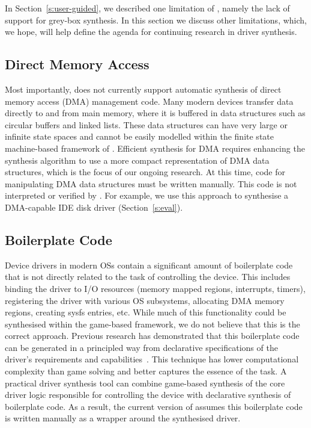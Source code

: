 In Section~\ref{s:user-guided}, we described one limitation of \termite, namely the lack of support for grey-box synthesis.  In this section we discuss other limitations, which, we hope, will help define the agenda for continuing research in driver synthesis.

\subsection{Direct Memory Access}

Most importantly, \termite does not currently support automatic synthesis of direct memory access (DMA) management code.  Many modern devices transfer data directly to and from main memory, where it is buffered in data structures such as circular buffers and linked lists.  These data structures can have very large or infinite state spaces and cannot be easily modelled within the finite state machine-based framework of \termite.  Efficient synthesis for DMA requires enhancing the synthesis algorithm to use a more compact representation of DMA data structures, which is the focus of our ongoing research.  At this time, code for manipulating DMA data structures must be written manually.  This code is not interpreted or verified by \termite.  For example, we use this approach to synthesise a DMA-capable IDE disk driver (Section~\ref{s:eval}).

\subsection{Boilerplate Code}

Device drivers in modern OSs contain a significant amount of boilerplate code that is not directly related to the task of controlling the device.  This includes binding the driver to I/O resources (memory mapped regions, interrupts, timers), registering the driver with various OS subsystems, allocating DMA memory regions, creating sysfs entries, etc.  While much of this functionality could be synthesised within the game-based framework, we do not believe that this is the correct approach.  Previous research has demonstrated that this boilerplate code can be generated in a principled way from declarative specifications of the driver's requirements and capabilities~\cite{Spear_RHHL_06}.  This technique has lower computational complexity than game solving and better captures the essence of the task.  A practical driver synthesis tool can combine game-based synthesis of the core driver logic responsible for controlling the device with declarative synthesis of boilerplate code.  As a result, the current version of \termite assumes this boilerplate code is written manually as a wrapper around the synthesised driver.

